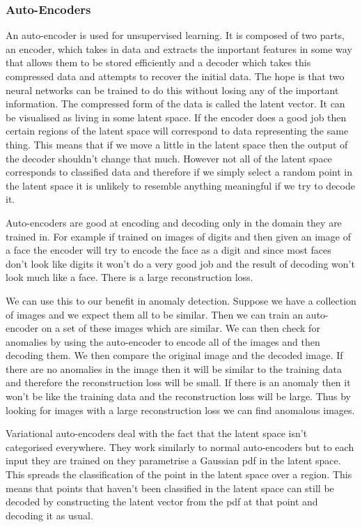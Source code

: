 \documentclass[a4paper]{article}
\begin{document}
    \subsubsection{Auto-Encoders}
    An auto-encoder is used for unsupervised learning.
    It is composed of two parts, an encoder, which takes in data and extracts the important features in some way that allows them to be stored efficiently and a decoder which takes this compressed data and attempts to recover the initial data.
    The hope is that two neural networks can be trained to do this without losing any of the important information.
    The compressed form of the data is called the latent vector.
    It can be visualised as living in some latent space.
    If the encoder does a good job then certain regions of the latent space will correspond to data representing the same thing.
    This means that if we move a little in the latent space then the output of the decoder shouldn't change that much.
    However not all of the latent space corresponds to classified data and therefore if we simply select a random point in the latent space it is unlikely to resemble anything meaningful if we try to decode it.
    
    Auto-encoders are good at encoding and decoding only in the domain they are trained in.
    For example if trained on images of digits and then given an image of a face the encoder will try to encode the face as a digit and since most faces don't look like digits it won't do a very good job and the result of decoding won't look much like a face.
    There is a large reconstruction loss.
    
    We can use this to our benefit in anomaly detection.
    Suppose we have a collection of images and we expect them all to be similar.
    Then we can train an auto-encoder on a set of these images which are similar.
    We can then check for anomalies by using the auto-encoder to encode all of the images and then decoding them.
    We then compare the original image and the decoded image.
    If there are no anomalies in the image then it will be similar to the training data and therefore the reconstruction loss will be small.
    If there is an anomaly then it won't be like the training data and the reconstruction loss will be large.
    Thus by looking for images with a large reconstruction loss we can find anomalous images.
    
    Variational auto-encoders deal with the fact that the latent space isn't categorised everywhere.
    They work similarly to normal auto-encoders but to each input they are trained on they parametrise a Gaussian \gls{pdf} in the latent space.
    This spreads the classification of the point in the latent space over a region.
    This means that points that haven't been classified in the latent space can still be decoded by constructing the latent vector from the \gls{pdf} at that point and decoding it as usual.
    
\end{document}
